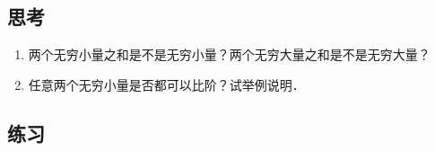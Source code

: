 \documentclass[a4paper,punct=CCT]{ctexbook}
\theoremstyle{definition}
\theoremstyle{remark}
\newif\ifshowex
\newif\ifshowsolp
\begin{document}
\subsection*{思考}

\begin{enumerate}
\item 两个无穷小量之和是不是无穷小量？两个无穷大量之和是不是无穷大量？

  \ifshowsolp
  是．不是．前者可由极限的加法法则得出．后者可以构造反例，函数\(f(x) = x,\ g(x) = -x\)．这里的\(f\)和\(g\)在无穷处都是无穷大量，但是\(f+g\)是常函数．
  \fi

\item 任意两个无穷小量是否都可以比阶？试举例说明．

  \ifshowsolp
  不一定．例如，函数\(x \sin\frac1x\)和\(x\)在原点处都是无穷小量，但是它们的商发散．
  \fi
\end{enumerate}

\ifshowex
{}
\subsection*{练习}
\end{document}
